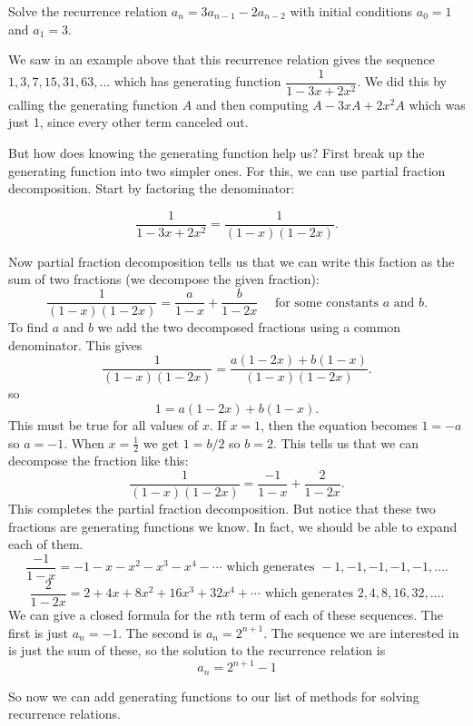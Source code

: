 \documentclass[12pt]{article}
\begin{document}
\begin{example}
 Solve the recurrence relation $a_n = 3a_{n-1} - 2a_{n-2}$ with initial conditions $a_0 = 1$ and $a_1 = 3$.  
 
 \begin{solution}
  We saw in an example above that this recurrence relation gives the sequence $1, 3, 7, 15, 31, 63, \ldots$ which has generating function $\dfrac{1}{1 - 3x + 2x^2}$.  We did this by calling the generating function $A$ and then computing $A - 3xA + 2x^2A$ which was just 1, since every other term canceled out.  
  
  But how does knowing the generating function help us?  First break up the generating function into two simpler ones.  For this, we can use partial fraction decomposition. Start by factoring the denominator:
  
  \[\frac{1}{1-3x + 2x^2} = \frac{1}{(1-x)(1-2x)}.\]
  
  Now partial fraction decomposition tells us that we can write this faction as the sum of two fractions (we decompose the given fraction):
  \[\frac{1}{(1-x)(1-2x)} = \frac{a}{1-x} + \frac{b}{1-2x} \mbox{ ~~ for some constants $a$ and $b$}.\]
  To find $a$ and $b$ we add the two decomposed fractions using a common denominator.  This gives
  \[\frac{1}{(1-x)(1-2x)} = \frac{a(1-2x) + b(1-x)}{(1-x)(1-2x)}.\]
  so
  \[1 = a(1-2x) + b(1-x).\]
  This must be true for all values of $x$.  If $x = 1$, then the equation becomes $1 = -a$ so $a = -1$.  When $x = \frac{1}{2}$ we get $1 = b/2$ so $b = 2$.  This tells us that we can decompose the fraction like this:
  \[\frac{1}{(1-x)(1-2x)} = \frac{-1}{1-x} + \frac{2}{1-2x}.\]
  This completes the partial fraction decomposition.  But notice that these two fractions are generating functions we know.  In fact, we should be able to expand each of them.
  \[\frac{-1}{1-x} = -1 - x - x^2 -x^3 - x^4 - \cdots \mbox{ which generates } -1, -1, -1, -1, -1, \ldots.\]
  \[\frac{2}{1-2x} = 2 + 4x + 8x^2 + 16x^3 + 32x^4 + \cdots \mbox{ which generates } 2, 4, 8, 16, 32, \ldots.\]
  We can give a closed formula for the $n$th term of each of these sequences.  The first is just $a_n = -1$.  The second is $a_n = 2^{n+1}$.  The sequence we are interested in is just the sum of these, so the solution to the recurrence relation is 
  \[a_n = 2^{n+1} - 1\]
 \end{solution}

\end{example}
  
So now we can add generating functions to our list of methods for solving recurrence relations.
\end{document}

